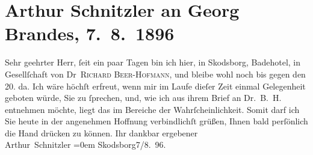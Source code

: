 

         
         \renewcommand{\erwaehntePersonen}{Personen: Richard Beer-Hofmann, Georg Brandes}
         \renewcommand{\erwaehnteOrte}{Orte: Badehotel, Skodsborg}
         \renewcommand{\erwaehnteWerke}{}
               \section[Arthur Schnitzler an Georg Brandes, 7. 8. 1896]{ Arthur Schnitzler an Georg Brandes, 7. 8. 1896}\nopagebreak{}\rehead{ }\begin{ledgroupsized}[t]{13cm}\normalsize\beginnumbering \toendnotes[C]{\smallbreak\pagebreak[2]} 
\pstart{}{\pb}Sehr geehrter Herr,\pend\pstart
           ſeit ein paar Tagen bin ich hier, in Skodsborg,
                  Badehotel, in Gesellſchaft von Dr \textsc{Richard Beer-Hofmann}, und bleibe wohl noch bis gegen den 20. da. Ich wäre höchſt
               erfreut, wenn mir im Laufe dieſer Zeit einmal Gelegenheit geboten würde, Sie zu
               ſprechen, und, wie ich aus ihrem Brief an Dr. B. H. entnehmen {\pb}möchte, liegt das im
               Bereiche der Wahrſcheinlichkeit. Somit darf ich Sie heute in der angenehmen Hoffnung
               verbindlichſt grüßen, Ihnen bald perſönlich die Hand drücken zu können.\pend
           \pstart
           Ihr dankbar ergebener{\\[\baselineskip]}\spacefill\mbox{Arthur Schnitzler}\pend
           \leftskip=0em{}\pstart
           Skodsborg7/8. 96.\pend
           
         
         \endnumbering{}\end{ledgroupsized}  \newcommand{\dateiname}{L00578}\newcommand{\titel}{Arthur Schnitzler an Georg Brandes, 7. 8. 1896}\newcommand{\editorInnen}{Martin Anton Müller und Gerd-Hermann Susen}
      